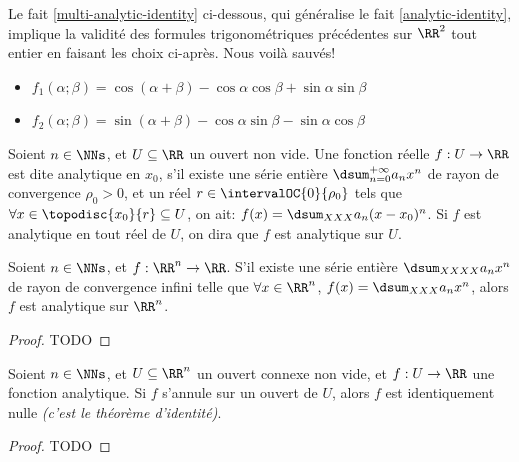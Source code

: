 Le fait \ref{multi-analytic-identity} ci-dessous, qui généralise le fait \ref{analytic-identity}, implique la validité des formules trigonométriques précédentes sur $\RR^2$ tout entier en faisant les choix ci-après.
Nous voilà sauvés!
%
\begin{itemize}[label=\small\textbullet]
	\item $f_1(\alpha ; \beta) = \cos(\alpha + \beta) - \cos \alpha \cos \beta + \sin \alpha \sin \beta$

	\item $f_2(\alpha ; \beta) = \sin(\alpha + \beta) - \cos \alpha \sin \beta - \sin \alpha \cos \beta$
\end{itemize}






\begin{defi}
    Soient $n \in \NNs$, et $U \subseteq \RR$ un ouvert non vide.
	Une fonction réelle $f: U \rightarrow \RR$ est dite analytique en $x_0$, 
	s'il existe
	une série entière $\dsum_{n = 0}^{+\infty} a_n x^n$
	de rayon de convergence $\rho_0 > 0$,
	et
	un réel $r \in \intervalOC{0}{\rho_0}$ tels que 
	$\forall x \in \topodisc{x_0}{r} \subseteq U$, on ait:
	$f(x) = \dsum_{XXX} a_n (x - x_0)^n$.
	Si $f$ est analytique en tout réel de $U$, on dira que $f$ est analytique sur $U$.
\end{defi}



\begin{fact} \label{multi-power-series-vs-analytic}
    Soient $n \in \NNs$, et $f: \RR^n \rightarrow \RR$.
    S'il existe une série entière $\dsum_{XXXX} a_n x^n$ de rayon de convergence infini
    telle que
	$\forall x \in \RR^n$, $f(x) = \dsum_{XXX} a_n x^n$,
	alors
	$f$ est analytique sur $\RR^n$. 
\end{fact}


\begin{proof}
	TODO
\end{proof}



\begin{fact} \label{multi-analytic-identity}
    Soient $n \in \NNs$, et $U \subseteq \RR^n$ un ouvert connexe non vide,
    et
    $f: U \rightarrow \RR$ une fonction analytique.
	Si $f$ s'annule sur un ouvert de $U$, alors $f$ est identiquement nulle
	\emph{(c'est le théorème d'identité)}.  
\end{fact}


\begin{proof}
	TODO
\end{proof}